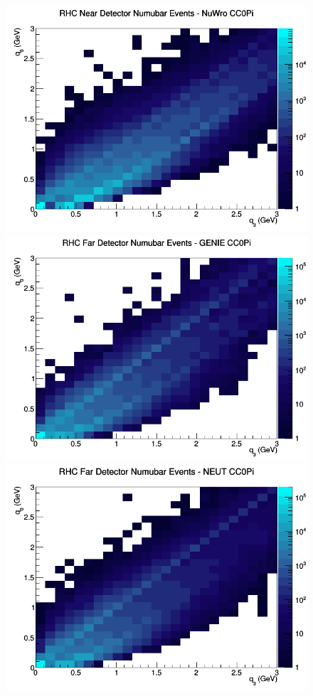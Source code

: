 \documentclass[12pt]{article}
\begin{document}
\begin{figure}[h]
\includegraphics[width=\linewidth]{eff_q0_q3/FGT/CC0Pi_RHC_ND_numubar_q3_q0_NuWro.png}
\endminipage
\newline
{}
\includegraphics[width=\linewidth]{eff_q0_q3/FGT/CC0Pi_RHC_FD_numubar_q3_q0_GENIE.png}
\endminipage
{}
\includegraphics[width=\linewidth]{eff_q0_q3/FGT/CC0Pi_RHC_FD_numubar_q3_q0_NEUT.png}

\end{figure}
\end{document}
